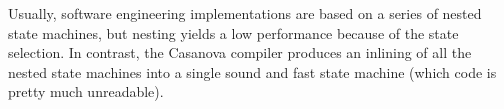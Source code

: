 Usually, software engineering implementations are based on a series of nested state machines, but nesting yields a low performance because of the state selection. In contrast, the Casanova compiler produces an inlining of all the nested state machines into a single sound and fast state machine (which code is pretty much unreadable).


